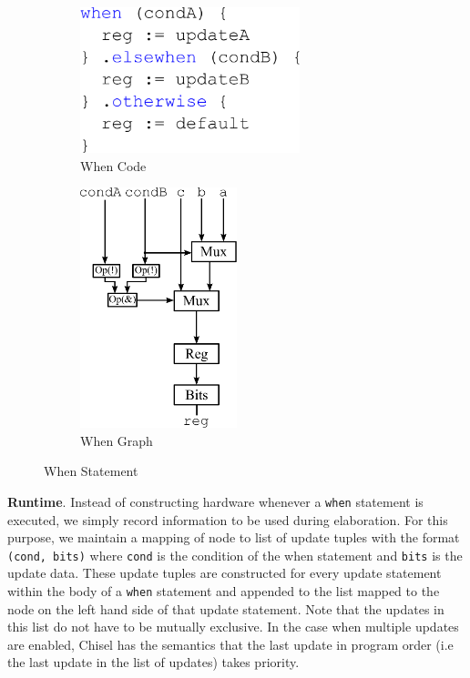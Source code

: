\begin{figure}[htb]
\centering
  \begin{subfigure}[t]{0.48\textwidth}
  \centering
  \includegraphics[width=0.7\textwidth]{figures/when.pdf}
  \caption{When Code}
  \label{fig:whenscala}
  \end{subfigure}
  \hfill
  \begin{subfigure}[t]{0.48\textwidth}
  \centering
  \includegraphics[width=0.5\textwidth]{figures/whengraph.pdf}
  \caption{When Graph}
  \label{fig:whenelab}
  \end{subfigure}
\caption{When Statement}
\label{fig:when}
\end{figure}

{\bf Runtime}. Instead of constructing hardware whenever a {\tt when}
statement is executed, we simply record information to be used during
elaboration. For this purpose, we maintain a mapping of node to list
of update tuples with the format {\tt (cond, bits)} where {\tt cond}
is the condition of the when statement and {\tt bits} is the update
data. These update tuples are constructed for every update statement
within the body of a {\tt when} statement and appended to the list
mapped to the node on the left hand side of that update
statement. Note that the updates in this list do not have to be
mutually exclusive. In the case when multiple updates are enabled,
Chisel has the semantics that the last update in program order (i.e
the last update in the list of updates) takes priority.

